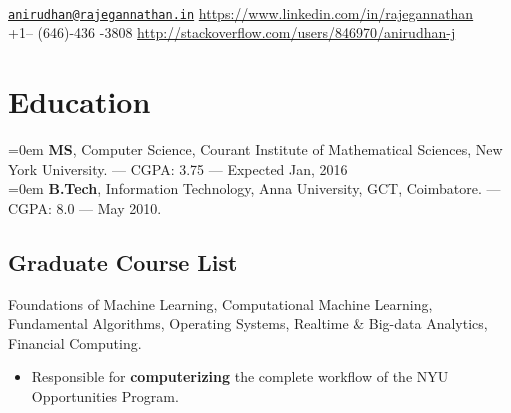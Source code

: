 \documentclass{resume}
\begin{document}
\\
{\href{mailto:anirudhan@rajegannathan.in}{\nolinkurl{anirudhan@rajegannathan.in}} \hfill \url{https://www.linkedin.com/in/rajegannathan}}\\
{+1-- (646)-436 -3808 \hfill \url{http://stackoverflow.com/users/846970/anirudhan-j}}

\section{Education}
\noindent \hangindent=0em  \textbf{MS}, Computer Science, Courant Institute of Mathematical Sciences, New York University. --- CGPA\@: 3.75 --- Expected Jan, 2016\\
\noindent \hangindent=0em  \textbf{B.Tech}, Information Technology, Anna University, GCT, Coimbatore. --- CGPA\@: 8.0 --- May 2010.

\subsection{Graduate Course List}
Foundations of Machine Learning, Computational Machine Learning, Fundamental Algorithms, Operating Systems, Realtime \& Big-data Analytics, Financial Computing.

\begin{itemize} \itemsep1pt \parskip0pt
  \item Responsible for \textbf{computerizing} the complete workflow of the NYU Opportunities Program.
\end{itemize}
\end{document}
